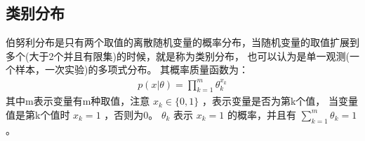 \documentclass[letterpaper,10pt,english]{sphinxmanual}
\begin{document}
\subsection{类别分布}
\label{\detokenize{_u6307_u6570_u65cf/content:id4}}
伯努利分布是只有两个取值的离散随机变量的概率分布，当随机变量的取值扩展到多个(大于2个并且有限集)的时候，就是称为类别分布，
也可以认为是单一观测(一个样本，一次实验)的多项式分布。
其概率质量函数为：
\begin{equation}\label{equation:指数族/content:指数族/content:6}
\begin{split}p(x|\theta) = \prod_{k=1}^m \theta_k^{x_k}\end{split}
\end{equation}
其中m表示变量有m种取值，注意 \(x_k \in \{0,1\}\) ，表示变量是否为第k个值，
当变量值是第k个值时 \(x_k=1\) ，否则为0。
\(\theta_k\) 表示 \(x_k=1\) 的概率，并且有 \(\sum_{k=1}^m \theta_k=1\) 。
\end{document}
